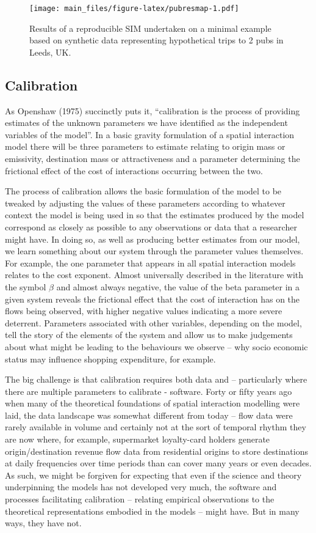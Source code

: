 \documentclass[11pt,letterpaper]{article}
\begin{document}
\begin{figure}
\centering
\texttt{[image: main\_files/figure-latex/pubresmap-1.pdf]}
\caption{\label{fig:pubresmap}Results of a reproducible SIM undertaken on a minimal example based on synthetic data representing hypothetical trips to 2 pubs in Leeds, UK.}
\end{figure}

\hypertarget{calibration}{%
\subsection{Calibration}\label{calibration}}

As Openshaw (1975) succinctly puts it, ``calibration is the process of providing estimates of the unknown parameters we have identified as the independent variables of the model''.
In a basic gravity formulation of a spatial interaction model there will be three parameters to estimate relating to origin mass or emissivity, destination mass or attractiveness and a parameter determining the frictional effect of the cost of interactions occurring between the two.

The process of calibration allows the basic formulation of the model to be tweaked by adjusting the values of these parameters according to whatever context the model is being used in so that the estimates produced by the model correspond as closely as possible to any observations or data that a researcher might have.
In doing so, as well as producing better estimates from our model, we learn something about our system through the parameter values themselves.
For example, the one parameter that appears in all spatial interaction models relates to the cost exponent.
Almost universally described in the literature with the symbol \(\beta\) and almost always negative, the value of the beta parameter in a given system reveals the frictional effect that the cost of interaction has on the flows being observed, with higher negative values indicating a more severe deterrent.
Parameters associated with other variables, depending on the model, tell the story of the elements of the system and allow us to make judgements about what might be leading to the behaviours we observe -- why socio economic status may influence shopping expenditure, for example.

The big challenge is that calibration requires both data and -- particularly where there are multiple parameters to calibrate - software.
Forty or fifty years ago when many of the theoretical foundations of spatial interaction modelling were laid, the data landscape was somewhat different from today -- flow data were rarely available in volume and certainly not at the sort of temporal rhythm they are now where, for example, supermarket loyalty-card holders generate origin/destination revenue flow data from residential origins to store destinations at daily frequencies over time periods than can cover many years or even decades.
As such, we might be forgiven for expecting that even if the science and theory underpinning the models has not developed very much, the software and processes facilitating calibration -- relating empirical observations to the theoretical representations embodied in the models -- might have.
But in many ways, they have not.
\end{document}
